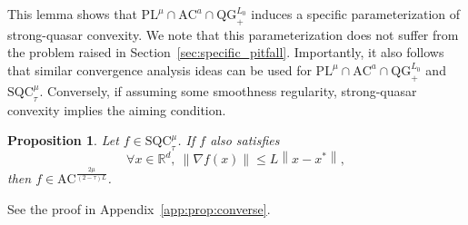 \documentclass{article}
\newcommand{\jh}[1]{{\color{red} #1}}
\def\R{{\mathbb{R}}}
\def\pl{{\text{PL}^\mu}}
\newcommand{\norm}[1]{\left\lVert#1\right\rVert}
\newcommand{\sqc}{\text{SQC}_{\tau}^{\mu}}
\newcommand{\ac}{\text{AC}^{a}}
\newcommand{\acf}[1]{\text{AC}^{#1}}
\newcommand{\qg}{\text{QG}_{+}^{L_0}}
\newcommand{\plf}[1]{\text{PL}^{#1}}
\theoremstyle{plain}
\newtheorem{proposition}[theorem]{Proposition}
\theoremstyle{definition}
\theoremstyle{remark}
\begin{document}
This lemma shows that $\pl \cap \ac \cap \qg $ induces a specific parameterization of strong-quasar convexity.  We note that this parameterization does not suffer from the problem raised in Section~\ref{sec:specific_pitfall}. Importantly, it also follows that similar convergence analysis ideas can be used for $\pl \cap \ac \cap \qg $ and $\sqc$.  
Conversely, if assuming some smoothness regularity, strong-quasar convexity implies the aiming condition.
\begin{proposition}\label{prop:converse_link}
    Let $f \in \sqc$. If $f$ also satisfies 
    \begin{equation}
         \forall x \in \R^d,~ \norm{\nabla f(x)}\le L\norm{x-x^\ast},
    \end{equation}
    then $f \in \acf{\frac{2\mu}{(2-\tau)L}}$.
\end{proposition}
See the proof in Appendix~\ref{app:prop:converse}.









\end{document}
